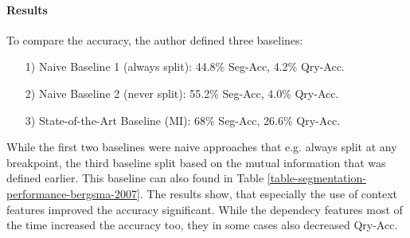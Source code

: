 

\paragraph*{Results}
To compare the accuracy, the author defined three baselines:
\begin{enumerate}
\item[1)] Naive Baseline 1 (always split): 44.8\% Seg-Acc, 4.2\% Qry-Acc.
\item[2)] Naive Baseline 2 (never split): 55.2\% Seg-Acc, 4.0\% Qry-Acc.
\item[3)] State-of-the-Art Baseline (MI): 68\% Seg-Acc, 26.6\% Qry-Acc.
\end{enumerate}
While the first two baselines were naive approaches that e.g. always split at any breakpoint, the third baseline split based on the mutual information that was defined earlier. This baseline can also found in Table \ref{table-segmentation-performance-bergsma-2007}. The results show, that especially the use of context features improved the accuracy significant. While the dependecy features most of the time increased the accuracy too, they in some cases also decreased Qry-Acc.